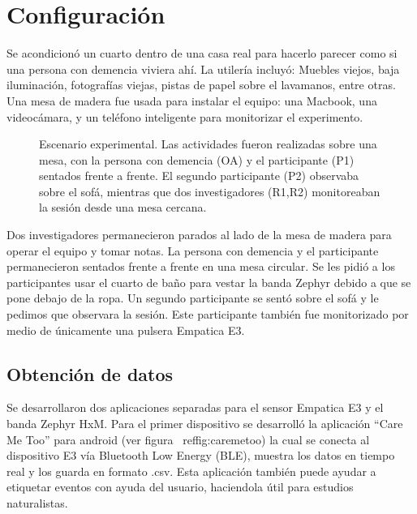 \section{Configuraci\'on}
Se acondicion\'o un cuarto dentro de una casa real para hacerlo parecer como si una persona con demencia viviera ah\'i. La utiler\'ia incluy\'o: Muebles viejos, baja iluminaci\'on, fotograf\'ias viejas, pistas de papel sobre el lavamanos, entre otras. Una mesa de madera fue usada para instalar el equipo: una Macbook, una videoc\'amara, y un tel\'efono inteligente para monitorizar el experimento.
\begin{figure}[h]
        \centering
        \caption{Escenario experimental. Las actividades fueron realizadas sobre una mesa, con la persona con demencia (OA) y el participante (P1) sentados frente a frente. El segundo participante (P2) observaba sobre el sof\'a, mientras que dos investigadores (R1,R2) monitoreaban la sesi\'on desde una mesa cercana.} \label{fig:img_exp_setup}
\end{figure}

Dos investigadores permanecieron parados al lado de la mesa de madera para operar el equipo y tomar notas. La persona con demencia y el participante permanecieron sentados frente a frente en una mesa circular. Se les pidi\'o a los participantes usar el cuarto de ba\~no para vestar la banda Zephyr debido a que se pone debajo de la ropa. Un segundo participante se sent\'o sobre el sof\'a y le pedimos que observara la sesi\'on. Este participante tambi\'en fue monitorizado por medio de \'unicamente una pulsera Empatica E3.


\subsection{Obtenci\'on de datos}
Se desarrollaron dos aplicaciones separadas para el sensor Empatica E3 y el banda Zephyr HxM. Para el primer dispositivo se desarroll\'o la aplicaci\'on ``Care Me Too'' para android (ver figura ~ref{fig:caremetoo}) la cual se conecta al dispositivo E3 v\'ia Bluetooth Low Energy (BLE), muestra los datos en tiempo real y los guarda en formato .csv. Esta aplicaci\'on tambi\'en puede ayudar a etiquetar eventos con ayuda del usuario, haciendola \'util para estudios naturalistas.


